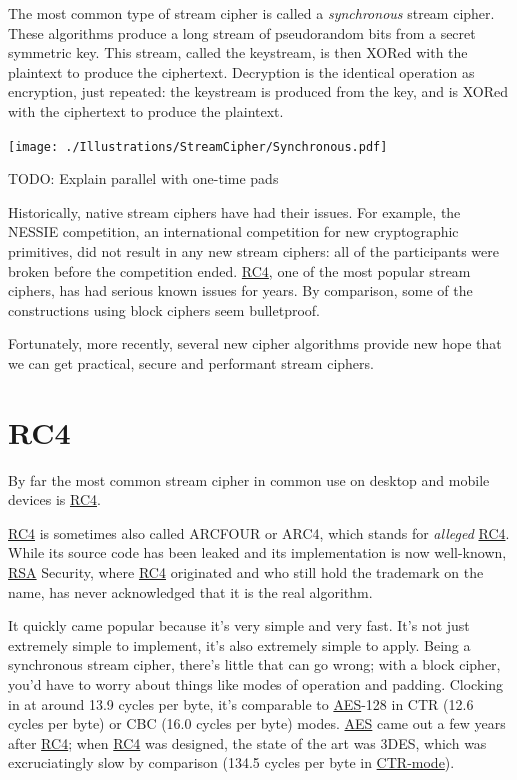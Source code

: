 \documentclass[11pt,ebook,table,dvipsnames]{memoir}
\begin{document}
The most common type of stream cipher is called a \emph{synchronous} stream
cipher. These algorithms produce a long stream of pseudorandom bits
from a secret symmetric key. This stream, called the keystream, is
then XORed with the plaintext to produce the ciphertext. Decryption is
the identical operation as encryption, just repeated: the keystream is
produced from the key, and is XORed with the ciphertext to produce the
plaintext.

\texttt{[image: ./Illustrations/StreamCipher/Synchronous.pdf]}

TODO: Explain parallel with one-time pads

Historically, native stream ciphers have had their issues. For
example, the NESSIE competition, an international competition for new
cryptographic primitives, did not result in any new stream ciphers:
all of the participants were broken before the competition ended. \hyperref[RC4]{RC4},
one of the most popular stream ciphers, has had serious known issues
for years. By comparison, some of the constructions using block
ciphers seem bulletproof.

Fortunately, more recently, several new cipher algorithms provide new
hope that we can get practical, secure and performant stream ciphers.
\section{\label{RC4}RC4}
\label{sec-2-3-9}

By far the most common \gls{stream cipher} in common use on desktop
and mobile devices is \hyperref[RC4]{RC4}.

\hyperref[RC4]{RC4} is sometimes also called ARCFOUR or ARC4, which stands for
\emph{alleged} \hyperref[RC4]{RC4}. While its source code has been leaked and its
implementation is now well-known, \hyperref[RSA]{RSA} Security, where \hyperref[RC4]{RC4} originated
and who still hold the trademark on the name, has never acknowledged
that it is the real algorithm.

It quickly came popular because it's very simple and very fast. It's
not just extremely simple to implement, it's also extremely simple to
apply. Being a synchronous stream cipher, there's little that can go
wrong; with a block cipher, you'd have to worry about things like
modes of operation and padding. Clocking in at around 13.9 cycles per
byte, it's comparable to \hyperref[AES]{AES}-128 in CTR (12.6 cycles per byte) or CBC
(16.0 cycles per byte) modes. \hyperref[AES]{AES} came out a few years after \hyperref[RC4]{RC4}; when
\hyperref[RC4]{RC4} was designed, the state of the art was 3DES, which was
excruciatingly slow by comparison (134.5 cycles per byte in \hyperref[CTR mode]{CTR-mode}).
\cite{cryptopp:bench}
\end{document}
